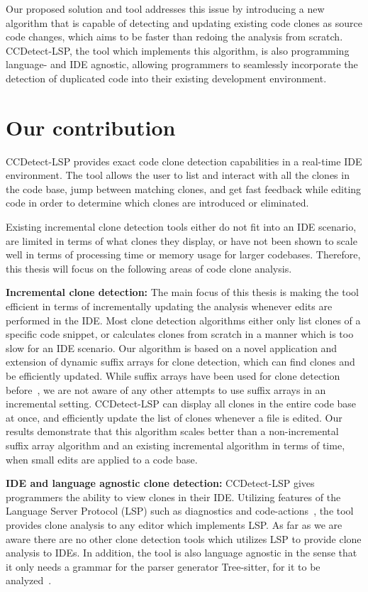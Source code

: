 Our proposed solution and tool addresses this issue by introducing a new algorithm that is
capable of detecting and updating existing code clones as source code changes, which aims
to be faster than redoing the analysis from scratch. CCDetect-LSP, the tool which
implements this algorithm, is also programming language- and IDE agnostic, allowing
programmers to seamlessly incorporate the detection of duplicated code into their existing
development environment.

\section{Our contribution}

CCDetect-LSP provides exact code clone detection capabilities in a real-time IDE
environment. The tool allows the user to list and interact with all the clones in the code
base, jump between matching clones, and get fast feedback while editing code in order to
determine which clones are introduced or eliminated.

Existing incremental clone detection tools either do not fit into an IDE scenario, are
limited in terms of what clones they display, or have not been shown to scale well in
terms of processing time or memory usage for larger codebases. Therefore, this thesis will
focus on the following areas of code clone analysis.

\textbf{Incremental clone detection:} The main focus of this thesis is making the tool
efficient in terms of incrementally updating the analysis whenever edits are performed in
the IDE. Most clone detection algorithms either only list clones of a specific code
snippet, or calculates clones from scratch in a manner which is too slow for an IDE
scenario. Our algorithm is based on a novel application and extension of dynamic suffix
arrays for clone detection, which can find clones and be efficiently updated. While suffix
arrays have been used for clone detection before~\cite{SHINOBI}, we are not aware of any
other attempts to use suffix arrays in an incremental setting. CCDetect-LSP can display
all clones in the entire code base at once, and efficiently update the list of clones
whenever a file is edited. Our results demonstrate that this algorithm scales better than
a non-incremental suffix array algorithm and an existing incremental algorithm in terms of
time, when small edits are applied to a code base.

\textbf{IDE and language agnostic clone detection:} CCDetect-LSP gives programmers the
ability to view clones in their IDE. Utilizing features of the Language Server Protocol
(LSP) such as diagnostics and code-actions~\cite{lsp}, the tool provides clone analysis to
any editor which implements LSP. As far as we are aware there are no other clone detection
tools which utilizes LSP to provide clone analysis to IDEs. In addition, the tool is also
language agnostic in the sense that it only needs a grammar for the parser generator
Tree-sitter, for it to be analyzed~\cite{treesitter}. 

